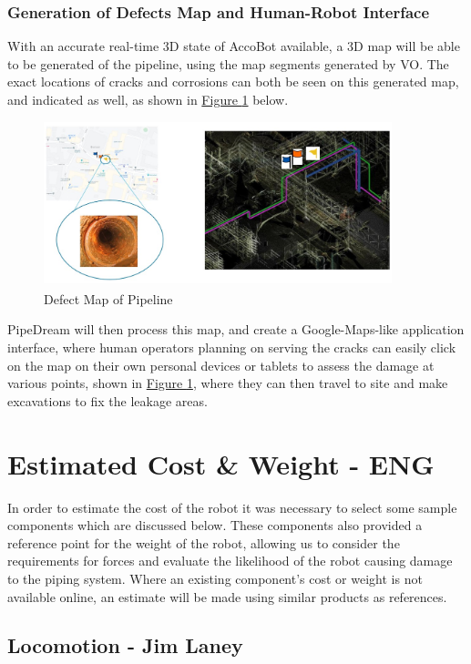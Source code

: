 \documentclass[11pt]{article}		%
\newcommand{\supercite}[1]{\textsuperscript{\cite{#1}}}		%
\newcommand{\figref}[1]{\hyperref[#1]{Figure \ref*{#1}}}    %
\begin{document}
	\subsubsection{Generation of Defects Map and Human-Robot Interface}
	With an accurate real-time 3D state of AccoBot available, a 3D map will be able to be generated of the pipeline, using the map segments generated by VO. The exact locations of cracks and corrosions can both be seen on this generated map, and indicated as well, as shown in \figref{defectMap} below.
				\begin{figure}[h]
				\centering
				\includegraphics[width=0.9\textwidth]{mapping.jpg}
				\caption{Defect Map of Pipeline\supercite{ELFTransmitter}}
				\label{defectMap}
			\end{figure}
	PipeDream will then process this map, and create a Google-Maps-like application interface, where human operators planning on serving the cracks can easily click on the map on their own personal devices or tablets to assess the damage at various points, shown in \figref{defectMap}, where they can then travel to site and make excavations to fix the leakage areas. 

	\section{Estimated Cost \& Weight - ENG}
		
		In order to estimate the cost of the robot it was necessary to select some sample components which are discussed below.
		These components also provided a reference point for the weight of the robot, allowing us to consider the requirements for forces and evaluate the likelihood of the robot causing damage to the piping system.
		Where an existing component’s cost or weight is not available online, an estimate will be made using similar products as references. 
		
		\subsection[Locomotion]{Locomotion - Jim Laney}
		
\end{document}
